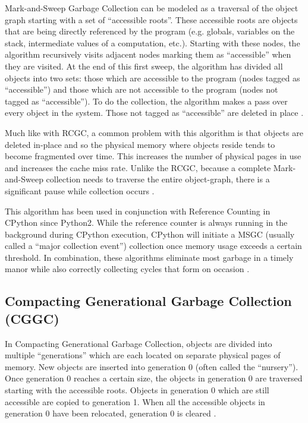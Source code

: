 \documentclass{article}
\begin{document}
\begin{sloppypar}
Mark-and-Sweep Garbage Collection can be modeled as a traversal of the object graph starting with a set of ``accessible roots''.  These accessible roots are objects that are being directly referenced by the program (e.g. globals, variables on the stack, intermediate values of a computation, etc.).  Starting with these nodes, the algorithm recursively visits adjacent nodes marking them as ``accessible'' when they are visited.  At the end of this first sweep, the algorithm has divided all objects into two sets: those which are accessible to the program (nodes tagged as ``accessible'') and those which are not accessible to the program (nodes not tagged as ``accessible'').  To do the collection, the algorithm makes a pass over every object in the system.  Those not tagged as ``accessible'' are deleted in place \cite{GC-continuum}. 

Much like with RCGC, a common problem with this algorithm is that objects are deleted in-place and so the physical memory where objects reside tends to become fragmented over time.  This increases the number of physical pages in use and increases the cache miss rate.  Unlike the RCGC, because a complete Mark-and-Sweep collection needs to traverse the entire object-graph, there is a significant pause while collection occurs \cite{GC-continuum}.  

This algorithm has been used in conjunction with Reference Counting in CPython since Python2.  While the reference counter is always running in the background during CPython execution, CPython will initiate a MSGC (usually called a ``major collection event'') collection once memory usage exceeds a certain threshold.  In combination, these algorithms eliminate most garbage in a timely manor while also correctly collecting cycles that form on occasion \cite{cpython3-doc}.  

\subsection{Compacting Generational Garbage Collection (CGGC)}\label{sec:CGGC}

In Compacting Generational Garbage Collection, objects are divided into multiple ``generations'' which are each located on separate physical pages of memory.  New objects are inserted into generation 0 (often called the ``nursery'').  Once generation 0 reaches a certain size, the objects in generation 0 are traversed starting with the accessible roots.  Objects in generation 0 which are still accessible are copied to generation 1.  When all the accessible objects in generation 0 have been relocated, generation 0 is cleared \cite{GC-continuum}.  


\end{sloppypar}
\end{document}
